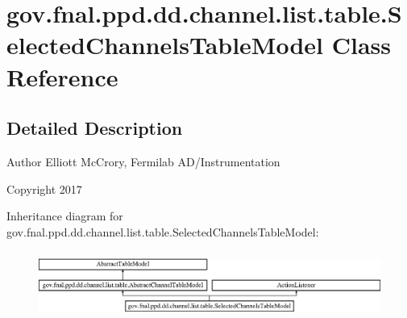 \hypertarget{classgov_1_1fnal_1_1ppd_1_1dd_1_1channel_1_1list_1_1table_1_1SelectedChannelsTableModel}{\section{gov.\-fnal.\-ppd.\-dd.\-channel.\-list.\-table.\-Selected\-Channels\-Table\-Model Class Reference}
\label{classgov_1_1fnal_1_1ppd_1_1dd_1_1channel_1_1list_1_1table_1_1SelectedChannelsTableModel}
}


\subsection{Detailed Description}
\begin{DoxyAuthor}{Author}
Elliott Mc\-Crory, Fermilab A\-D/\-Instrumentation 
\end{DoxyAuthor}
\begin{DoxyCopyright}{Copyright}
2017 
\end{DoxyCopyright}
Inheritance diagram for gov.\-fnal.\-ppd.\-dd.\-channel.\-list.\-table.\-Selected\-Channels\-Table\-Model\-:\begin{figure}[H]
\begin{center}
\leavevmode
\includegraphics[height=2.210526cm]{classgov_1_1fnal_1_1ppd_1_1dd_1_1channel_1_1list_1_1table_1_1SelectedChannelsTableModel}
\end{center}
\end{figure}
